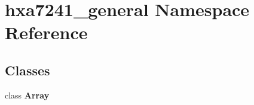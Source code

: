 \section{hxa7241\_\-general Namespace Reference}
\label{namespacehxa7241__general}


\subsection*{Classes}
\begin{CompactItemize}
\item 
class {\bf Array}
\end{CompactItemize}
